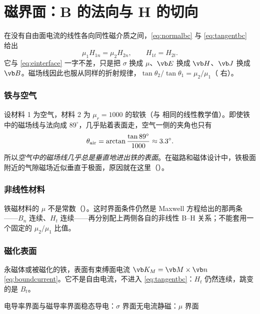\section{磁界面：B 的法向与 H 的切向}\label{sec:interfaces-magnetic}

在没有自由面电流的线性各向同性磁介质之间，\eqref{eq:normalbc} 与 \eqref{eq:tangentbc} 给出
\begin{equation}
\mu_1H_{1n}=\mu_2H_{2n},\qquad H_{1t}=H_{2t}.
\label{eq:hinterface}
\end{equation}
它与 \eqref{eq:einterface} 一字不差，只是把 $\sigma$ 换成 $\mu$、$\vb E$ 换成 $\vb H$、$\vb J$ 换成 $\vb B$。磁场线因此也服从同样的折射规律，$\tan\theta_2/\tan\theta_1=\mu_2/\mu_1$（ 右）。

\subsubsection{铁与空气} 设材料 1 为空气，材料 2 为 $\mu_r=1000$ 的软铁（与 相同的线性教学值）。即使铁中的磁场线与法向成 $89^\circ$，几乎贴着表面走，空气一侧的夹角也只有
\begin{equation*}
\theta_{\rm air}=\arctan\frac{\tan89^\circ}{1000}\approx3.3^\circ .
\end{equation*}
所以\emph{空气中的磁场线几乎总是垂直地进出铁的表面}。在磁路和磁体设计中，铁极面附近的气隙磁场近似垂直于极面，原因就在这里（）。

\subsubsection{非线性材料} 铁磁材料的 $\mu$ 不是常数（）。这时界面条件仍然是 Maxwell 方程给出的那两条——$B_n$ 连续、$H_t$ 连续——再分别配上两侧各自的非线性 B–H 关系；不能套用一个固定的 $\mu_2/\mu_1$ 比值。

\subsubsection{磁化表面} 永磁体或被磁化的铁，表面有束缚面电流 $\vb K_M=\vb M\times\vb n$ \eqref{eq:boundcurrent}。它不是自由电流，不进入 \eqref{eq:tangentbc}：$H_t$ 仍然连续，跳变的是 $B_t$。

\begin{compare}{电导率界面与磁导率界面}{稳态导电：$\sigma$ 界面}{无电流静磁：$\mu$ 界面}
\end{compare}

